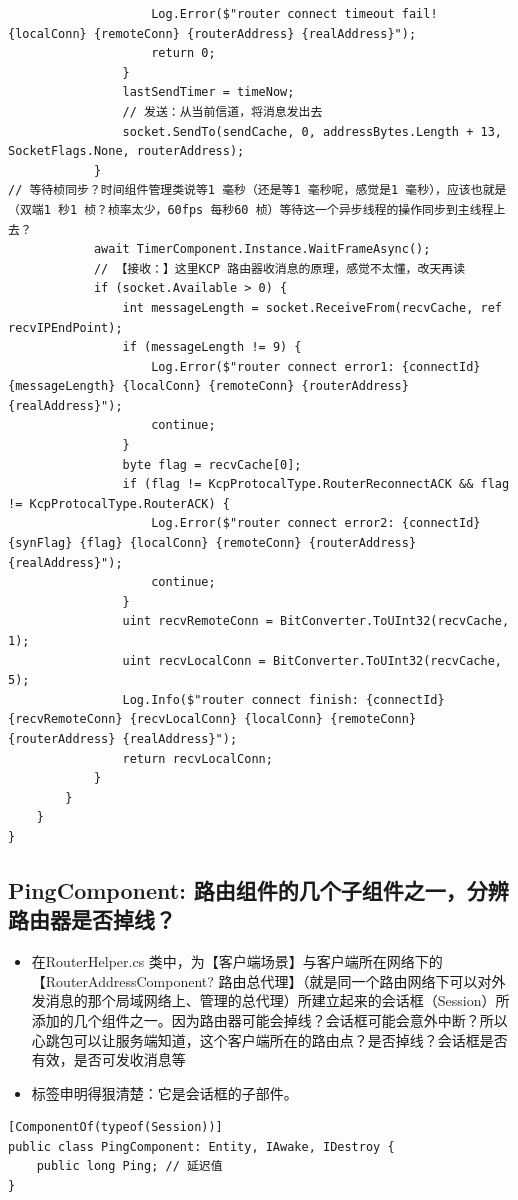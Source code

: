 \documentclass[9pt, b5paper]{article}
\begin{document}
\begin{verbatim}
                    Log.Error($"router connect timeout fail! {localConn} {remoteConn} {routerAddress} {realAddress}");
                    return 0;
                }
                lastSendTimer = timeNow;
                // 发送：从当前信道，将消息发出去
                socket.SendTo(sendCache, 0, addressBytes.Length + 13, SocketFlags.None, routerAddress);
            }
// 等待桢同步？时间组件管理类说等1 毫秒（还是等1 毫秒呢，感觉是1 毫秒），应该也就是（双端1 秒1 桢？桢率太少，60fps 每秒60 桢）等待这一个异步线程的操作同步到主线程上去？
            await TimerComponent.Instance.WaitFrameAsync(); 
            // 【接收：】这里KCP 路由器收消息的原理，感觉不太懂，改天再读
            if (socket.Available > 0) {
                int messageLength = socket.ReceiveFrom(recvCache, ref recvIPEndPoint);
                if (messageLength != 9) {
                    Log.Error($"router connect error1: {connectId} {messageLength} {localConn} {remoteConn} {routerAddress} {realAddress}");
                    continue;
                }
                byte flag = recvCache[0];
                if (flag != KcpProtocalType.RouterReconnectACK && flag != KcpProtocalType.RouterACK) {
                    Log.Error($"router connect error2: {connectId} {synFlag} {flag} {localConn} {remoteConn} {routerAddress} {realAddress}");
                    continue;
                }
                uint recvRemoteConn = BitConverter.ToUInt32(recvCache, 1);
                uint recvLocalConn = BitConverter.ToUInt32(recvCache, 5);
                Log.Info($"router connect finish: {connectId} {recvRemoteConn} {recvLocalConn} {localConn} {remoteConn} {routerAddress} {realAddress}");
                return recvLocalConn;
            }
        }
    }
}
\end{verbatim}
\subsection{PingComponent: 路由组件的几个子组件之一，分辨路由器是否掉线？}
\label{sec-7-16}
\begin{itemize}
\item 在RouterHelper.cs 类中，为【客户端场景】与客户端所在网络下的【RouterAddressComponent? 路由总代理】（就是同一个路由网络下可以对外发消息的那个局域网络上、管理的总代理）所建立起来的会话框（Session）所添加的几个组件之一。因为路由器可能会掉线？会话框可能会意外中断？所以心跳包可以让服务端知道，这个客户端所在的路由点？是否掉线？会话框是否有效，是否可发收消息等
\item 标签申明得狠清楚：它是会话框的子部件。
\end{itemize}
\begin{verbatim}
[ComponentOf(typeof(Session))]
public class PingComponent: Entity, IAwake, IDestroy {
    public long Ping; // 延迟值
}
\end{verbatim}
\end{document}
